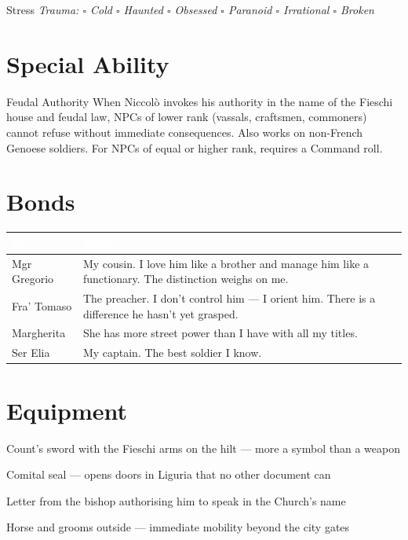 \medskip
\begin{pgclockbox}{Stress \hfill {}}
\small\textit{Trauma: $\square$ Cold \quad $\square$ Haunted \quad $\square$ Obsessed \quad $\square$ Paranoid \quad $\square$ Irrational \quad $\square$ Broken}
\end{pgclockbox}

\section*{Special Ability}
\begin{fieschibox}{Feudal Authority}
When Niccol\`o invokes his authority in the name of the Fieschi house and feudal
law, NPCs of lower rank (vassals, craftsmen, commoners) cannot refuse without
immediate consequences. Also works on non-French Genoese soldiers.
For NPCs of equal or higher rank, requires a Command roll.
\end{fieschibox}

\section*{Bonds}
\begin{table}[h]\centering\renewcommand{\arraystretch}{1.4}
\begin{tabularx}{\linewidth}{@{}L{2.6cm} X@{}}
\toprule{}
\textcolor{white}{\textbf{PC}} & \textcolor{white}{\textbf{Bond}} \\
\midrule
Mgr Gregorio & My cousin. I love him like a brother and manage him like a functionary. The distinction weighs on me. \\
Fra' Tomaso & The preacher. I don't control him --- I orient him. There is a difference he hasn't yet grasped. \\
Margherita & She has more street power than I have with all my titles. \\
Ser Elia & My captain. The best soldier I know. \\
\bottomrule
\end{tabularx}
\end{table}

\section*{Equipment}
\begin{goldlist}
\item Count's sword with the Fieschi arms on the hilt --- more a symbol than a weapon
\item Comital seal --- opens doors in Liguria that no other document can
\item Letter from the bishop authorising him to speak in the Church's name
\item Horse and grooms outside --- immediate mobility beyond the city gates
\end{goldlist}


